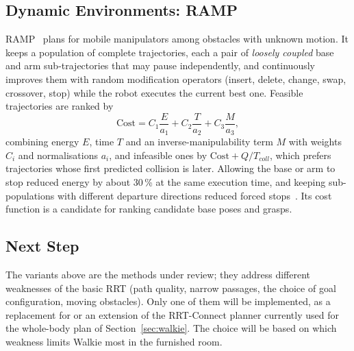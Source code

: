 \documentclass[12pt,a4paper]{article}
\begin{document}
\subsection{Dynamic Environments: RAMP}

RAMP~\cite{vannoy2008} plans for mobile manipulators among obstacles with unknown motion. It keeps a
population of complete trajectories, each a pair of \emph{loosely coupled} base and arm
sub-trajectories that may pause independently, and continuously improves them with random
modification operators (insert, delete, change, swap, crossover, stop) while the robot executes the
current best one. Feasible trajectories are ranked by
\begin{equation}
    \mathrm{Cost}=C_1\frac{E}{a_1}+C_2\frac{T}{a_2}+C_3\frac{M}{a_3},
\end{equation}
combining energy $E$, time $T$ and an inverse-manipulability term $M$ with weights $C_i$ and
normalisations $a_i$, and infeasible ones by $\mathrm{Cost}+Q/T_{coll}$, which prefers trajectories
whose first predicted collision is later. Allowing the base or arm to stop reduced energy by about
30\,\% at the same execution time, and keeping sub-populations with different departure directions
reduced forced stops~\cite{vannoy2008}. Its cost function is a candidate for
ranking candidate base poses and grasps.

\subsection{Next Step}

The variants above are the methods under review; they address different weaknesses of the basic RRT
(path quality, narrow passages, the choice of goal configuration, moving obstacles). Only one of them
will be implemented, as a replacement for or an extension of the RRT-Connect planner currently used
for the whole-body plan of Section~\ref{sec:walkie}. The choice will be based on which weakness
limits Walkie most in the furnished room.
\end{document}
